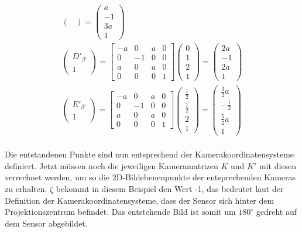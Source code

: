 \begin{gather}
\begin{pmatrix}
	\end{pmatrix}
	=
	\begin{pmatrix}
		a\\-1\\3a\\1
	\end{pmatrix}\\
	\begin{pmatrix}
		D'_{\beta'}\\1
	\end{pmatrix}
	=
	\begin{bmatrix}
		-a&0&a&0\\
		0&-1&0&0\\
		a&0&a&0\\
		0&0&0&1
	\end{bmatrix}
	\begin{pmatrix}
		0\\1\\2\\1
	\end{pmatrix}
	=
	\begin{pmatrix}
		2a\\-1\\2a\\1
	\end{pmatrix}\\
	\begin{pmatrix}
		E'_{\beta'}\\1
	\end{pmatrix}
	=
	\begin{bmatrix}
		-a&0&a&0\\
		0&-1&0&0\\
		a&0&a&0\\
		0&0&0&1
	\end{bmatrix}
	\begin{pmatrix}
		\frac{1}{2}\\\frac{1}{2}\\2\\1
	\end{pmatrix}
	=
	\begin{pmatrix}
		\frac{3}{2}a\\-\frac{1}{2}\\\frac{5}{2}a\\1
	\end{pmatrix}
\end{gather}\\

Die entstandenen Punkte sind nun entsprechend der Kamerakoordinatensysteme definiert. Jetzt müssen noch die jeweiligen Kameramatrizen $K$ und $K'$ mit diesen verrechnet werden, um so die 2D-Bildebenenpunkte der entsprechenden Kameras zu erhalten. $\zeta$ bekommt in diesem Beispiel den Wert -1, das bedeutet laut der Definition der Kamerakoordinatensysteme, dass der Sensor sich hinter dem Projektionszentrum befindet. Das entstehende Bild ist somit um \ensuremath{180^\circ} gedreht auf dem Sensor abgebildet.

